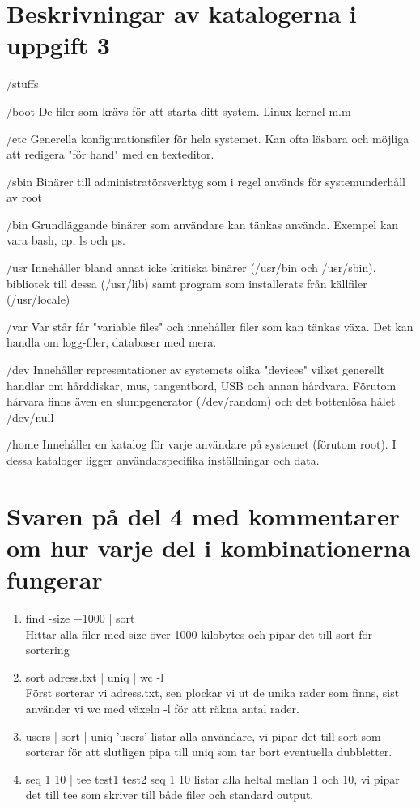 \documentclass[11pt]{article}
\begin{document}
\section{Beskrivningar av katalogerna i uppgift 3}
\begin{labeling}{/stuffs}
\item [/boot] De filer som krävs för att starta ditt system. Linux kernel m.m 
\item [/etc] Generella konfigurationsfiler för hela systemet. Kan ofta läsbara och möjliga att redigera "för hand" med en texteditor.
\item [/sbin] Binärer till administratörsverktyg som i regel används för systemunderhåll av root
\item [/bin] Grundläggande binärer som användare kan tänkas använda. Exempel kan vara bash, cp, ls och ps.
\item [/usr] Innehåller bland annat icke kritiska binärer (/usr/bin och /usr/sbin), bibliotek till dessa (/usr/lib) samt program som installerats från källfiler (/usr/locale)
\item [/var] Var står får "variable files" och innehåller filer som kan tänkas växa. Det kan handla om logg-filer, databaser med mera.
\item [/dev] Innehåller representationer av systemets olika "devices" vilket generellt handlar om hårddiskar, mus, tangentbord, USB och annan hårdvara. Förutom hårvara finns även en slumpgenerator (/dev/random) och det bottenlösa hålet /dev/null
\item [/home] Innehåller en katalog för varje användare på systemet (förutom root). I dessa kataloger ligger användarspecifika inställningar och data.
\end{labeling}
    
\section{Svaren på del 4 med kommentarer om hur varje del i kombinationerna fungerar}
\begin{enumerate}[label=(\alph*)]
\item find -size  +1000 | sort \\ 
Hittar alla filer med size över 1000 kilobytes och pipar det till sort för sortering
\item sort adress.txt | uniq | wc -l \\
Först sorterar vi adress.txt, sen plockar vi ut de unika rader som finns, sist använder vi wc med växeln -l för att räkna antal rader. 
\item users | sort | uniq
'users' listar alla användare, vi pipar det till sort som sorterar för att slutligen pipa till uniq som tar bort eventuella dubbletter.
\item seq 1 10 | tee test1 test2
seq 1 10 listar alla heltal mellan 1 och 10, vi pipar det till tee som skriver till både filer och standard output.
\end{enumerate}
\end{document}
